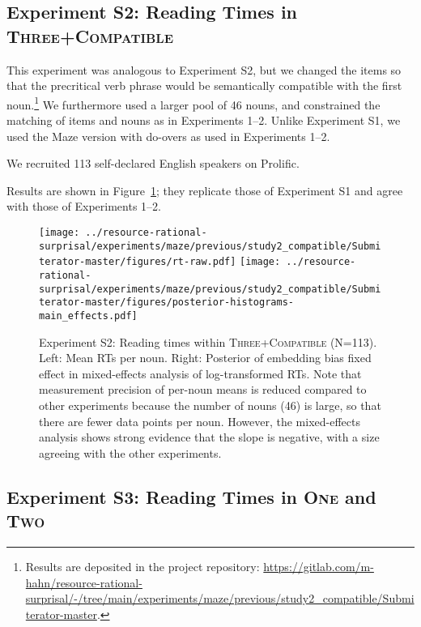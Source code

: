 \subsection{Experiment S2: Reading Times in \textsc{Three}+\textsc{Compatible}}\label{sec:rt-comp}

This experiment was analogous to Experiment S2, but we changed the items so that the precritical verb phrase would be semantically compatible with the first noun.\footnote{Results are deposited in the project repository: \url{https://gitlab.com/m-hahn/resource-rational-surprisal/-/tree/main/experiments/maze/previous/study2_compatible/Submiterator-master}.}
We furthermore used a larger pool of 46 nouns, and constrained the matching of items and nouns as in Experiments 1--2.
Unlike Experiment S1, we used the Maze version with do-overs as used in Experiments 1--2.



We recruited 113 self-declared English speakers on Prolific.

Results are shown in Figure~\ref{fig:expt-s2}; they replicate those of Experiment S1 and agree with those of Experiments 1--2.


\begin{figure}
	\centering

	\texttt{[image: ../resource-rational-surprisal/experiments/maze/previous/study2\_compatible/Submiterator-master/figures/rt-raw.pdf]}
	\texttt{[image: ../resource-rational-surprisal/experiments/maze/previous/study2\_compatible/Submiterator-master/figures/posterior-histograms-main\_effects.pdf]}

	\caption{Experiment S2: Reading times within \textsc{Three}+\textsc{Compatible} (N=113). Left: Mean RTs per noun. Right: Posterior of embedding bias fixed effect in mixed-effects analysis of log-transformed RTs. Note that measurement precision of per-noun means is reduced compared to other experiments because the number of nouns (46) is large, so that there are fewer data points per noun. However, the mixed-effects analysis shows strong evidence that the slope is negative, with a size agreeing with the other experiments.}\label{fig:expt-s2}
\end{figure}





\subsection{Experiment S3: Reading Times in \textsc{One} and \textsc{Two}}\label{sec:-rt-study-3}

